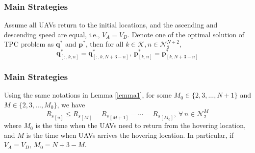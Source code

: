 \documentclass[11.5pt]{beamer}
\begin{document}
\begin{frame}
\frametitle{Main Strategies}
	\begin{lemma}\label{lemma1}
		Assume all UAVs return to the initial locations, and the ascending and descending speed are equal, i.e., $V_A=V_D$. Denote one of the optimal solution of TPC problem as $\boldsymbol{q}^*$ and $\boldsymbol{p}^*$, then for all $k\in\mathcal{K},n\in\mathcal{N}_2^{N+2}$,
		\begin{equation}\label{lemma1eq}
			\boldsymbol{q}^*_{[:,k,n]} = \boldsymbol{q}^*_{[:,k,N+3-n]},\ \boldsymbol{p}^*_{[k,n]} = \boldsymbol{p}^*_{[k,N+3-n]}
		\end{equation}
	\end{lemma}
\end{frame}


\begin{frame}
\frametitle{Main Strategies}
	\begin{lemma}
		Using the same notations in {\rm Lemma \ref{lemma1}}, for some $M_0\in\{2,3,\ldots,N+1\}$ and $M\in\{2,3,\ldots,M_0\}$, we have
		\begin{equation}\label{lemma2eq}
			{R_s}_{[n]}\leq {R_s}_{[M]}={R_s}_{[M+1]}=\cdots={R_s}_{[M_0]},\ \forall\,n\in\mathcal{N}_2^M
		\end{equation}
		where $M_0$ is the time when the UAVs need to return from the hovering location, and $M$ is the time when UAVs arrives the hovering location. In particular, if $V_A=V_D$, $M_0=N+3-M$.
	\end{lemma}
\end{frame}
\end{document}
